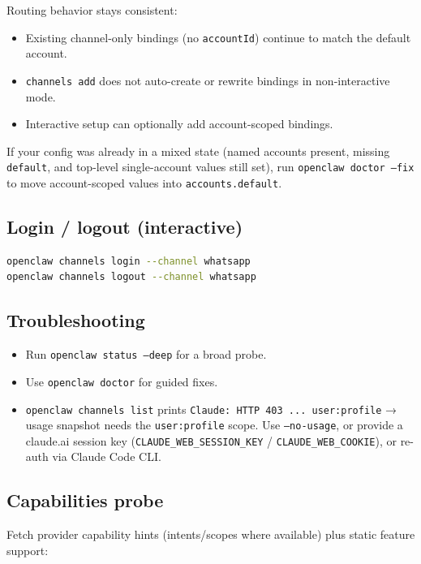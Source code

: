Routing behavior stays consistent:

\begin{itemize}
  \item Existing channel-only bindings (no \texttt{accountId}) continue to match the default account.
  \item \texttt{channels add} does not auto-create or rewrite bindings in non-interactive mode.
  \item Interactive setup can optionally add account-scoped bindings.
\end{itemize}


If your config was already in a mixed state (named accounts present, missing \texttt{default}, and top-level single-account values still set), run \texttt{openclaw doctor --fix} to move account-scoped values into \texttt{accounts.default}.

\subsection{Login / logout (interactive)}


\begin{lstlisting}[language=bash]
openclaw channels login --channel whatsapp
openclaw channels logout --channel whatsapp
\end{lstlisting}


\subsection{Troubleshooting}


\begin{itemize}
  \item Run \texttt{openclaw status --deep} for a broad probe.
  \item Use \texttt{openclaw doctor} for guided fixes.
  \item \texttt{openclaw channels list} prints \texttt{Claude: HTTP 403 ... user:profile} → usage snapshot needs the \texttt{user:profile} scope. Use \texttt{--no-usage}, or provide a claude.ai session key (\texttt{CLAUDE\_WEB\_SESSION\_KEY} / \texttt{CLAUDE\_WEB\_COOKIE}), or re-auth via Claude Code CLI.
\end{itemize}


\subsection{Capabilities probe}


Fetch provider capability hints (intents/scopes where available) plus static feature support:

